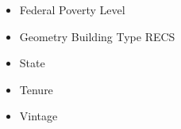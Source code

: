 \begin{itemize}
\item Federal Poverty Level
\item Geometry Building Type RECS
\item State
\item Tenure
\item Vintage
\end{itemize}
